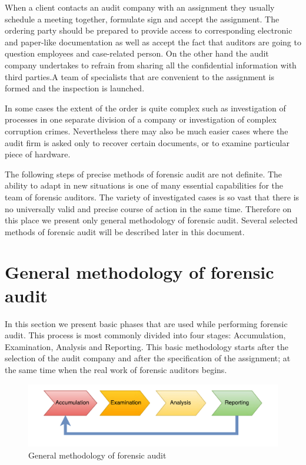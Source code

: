 When a client contacts an audit company with an assignment they usually schedule a meeting together, formulate sign and accept the assignment. The ordering party should be prepared to provide access to corresponding electronic and paper-like documentation as well as accept the fact that auditors are going to question employees and case-related person. On the other hand the audit company undertakes to refrain from sharing all the confidential information with third parties.A team of specialists that are convenient to the assignment is formed and the inspection is launched. 

In some cases the extent of the order is quite complex such as investigation of processes in one separate division of a company or investigation of complex corruption crimes. Nevertheless there may also be much easier cases where the audit firm is asked only to recover certain documents, or to examine particular piece of hardware. 

The following steps of precise methods of forensic audit are not definite. The ability to adapt in new situations is one of many essential capabilities for the team of forensic auditors. The variety of investigated cases is so vast that there is no universally valid and precise course of action in the same time. Therefore on this place we present only general methodology of forensic audit. Several selected methods of forensic audit will be described later in this document. 

\section{General methodology of forensic audit}
In this section we present basic phases that are used while performing forensic audit. This process is most commonly divided into four stages: Accumulation, Examination, Analysis and Reporting. This basic methodology starts after the  selection of the audit company and after the specification of the assignment; at the same time when the real work of forensic auditors begins.

\begin{figure}[h]
	\begin{center} 
	\includegraphics[width=1.0\textwidth]{img/general_methodology.pdf}
	\end{center}
	\caption{General methodology of forensic audit}
\end{figure}

